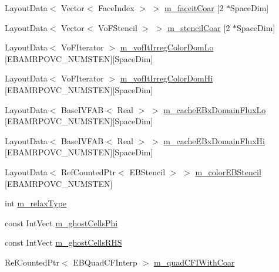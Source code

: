 \begin{DoxyCompactItemize}
\item 
Layout\+Data$<$ Vector$<$ Face\+Index $>$ $>$ \hyperlink{classebconductivityop_a9a2babb720c5443c5b69a0b3c5da7f49}{m\+\_\+faceit\+Coar} \mbox{[}2 $\ast$Space\+Dim\mbox{]}
\item 
Layout\+Data$<$ Vector$<$ Vo\+F\+Stencil $>$ $>$ \hyperlink{classebconductivityop_a134afe9874f31c76449d311f2a81a486}{m\+\_\+stencil\+Coar} \mbox{[}2 $\ast$Space\+Dim\mbox{]}
\item 
Layout\+Data$<$ Vo\+F\+Iterator $>$ \hyperlink{classebconductivityop_a581d21ebd1ed696c774bfdaf64d07d2f}{m\+\_\+vof\+It\+Irreg\+Color\+Dom\+Lo} \mbox{[}E\+B\+A\+M\+R\+P\+O\+V\+C\+\_\+\+N\+U\+M\+S\+T\+EN\mbox{]}\mbox{[}Space\+Dim\mbox{]}
\item 
Layout\+Data$<$ Vo\+F\+Iterator $>$ \hyperlink{classebconductivityop_a9c554e73bfc4b1a1347047224a20ba79}{m\+\_\+vof\+It\+Irreg\+Color\+Dom\+Hi} \mbox{[}E\+B\+A\+M\+R\+P\+O\+V\+C\+\_\+\+N\+U\+M\+S\+T\+EN\mbox{]}\mbox{[}Space\+Dim\mbox{]}
\item 
Layout\+Data$<$ Base\+I\+V\+F\+AB$<$ Real $>$ $>$ \hyperlink{classebconductivityop_ac7372f4b80e621f026d401a98aa70917}{m\+\_\+cache\+E\+Bx\+Domain\+Flux\+Lo} \mbox{[}E\+B\+A\+M\+R\+P\+O\+V\+C\+\_\+\+N\+U\+M\+S\+T\+EN\mbox{]}\mbox{[}Space\+Dim\mbox{]}
\item 
Layout\+Data$<$ Base\+I\+V\+F\+AB$<$ Real $>$ $>$ \hyperlink{classebconductivityop_a73be153aeeef1b6a801583a76c49a67e}{m\+\_\+cache\+E\+Bx\+Domain\+Flux\+Hi} \mbox{[}E\+B\+A\+M\+R\+P\+O\+V\+C\+\_\+\+N\+U\+M\+S\+T\+EN\mbox{]}\mbox{[}Space\+Dim\mbox{]}
\item 
Layout\+Data$<$ Ref\+Counted\+Ptr$<$ E\+B\+Stencil $>$ $>$ \hyperlink{classebconductivityop_aad7ee3814b90ffeee32595b874b9f042}{m\+\_\+color\+E\+B\+Stencil} \mbox{[}E\+B\+A\+M\+R\+P\+O\+V\+C\+\_\+\+N\+U\+M\+S\+T\+EN\mbox{]}
\item 
int \hyperlink{classebconductivityop_ad54189fc95d09641e979ebab2e254c13}{m\+\_\+relax\+Type}
\item 
const Int\+Vect \hyperlink{classebconductivityop_af5d27323ec83f4afc0173a52d0e43a1f}{m\+\_\+ghost\+Cells\+Phi}
\item 
const Int\+Vect \hyperlink{classebconductivityop_acebaa37fd03afe5ba08c8ebd1e0bc48a}{m\+\_\+ghost\+Cells\+R\+HS}
\item 
Ref\+Counted\+Ptr$<$ E\+B\+Quad\+C\+F\+Interp $>$ \hyperlink{classebconductivityop_aed80cfecb0c9b0589c0cf4cdc81a84c3}{m\+\_\+quad\+C\+F\+I\+With\+Coar}
\item 

\end{DoxyCompactItemize}
